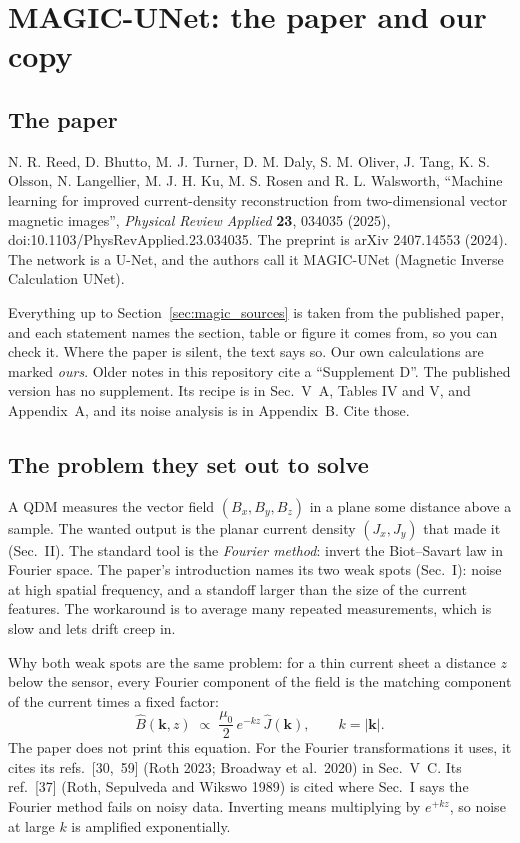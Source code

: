 \chapter{MAGIC-UNet: the paper and our copy}\label{ch:magic}

\section{The paper}

N. R. Reed, D. Bhutto, M. J. Turner, D. M. Daly, S. M. Oliver, J. Tang, K. S. Olsson, N. Langellier, M. J. H. Ku,
M. S. Rosen and R. L. Walsworth, ``Machine learning for improved current-density reconstruction from two-dimensional
vector magnetic images'', \emph{Physical Review Applied} \textbf{23}, 034035 (2025), doi:10.1103/PhysRevApplied.23.034035.
The preprint is arXiv 2407.14553 (2024). The network is a U-Net, and the authors call it MAGIC-UNet (Magnetic Inverse
Calculation UNet).

\begin{keyidea}
Everything up to Section~\ref{sec:magic_sources} is taken from the published paper, and each statement names the section,
table or figure it comes from, so you can check it. Where the paper is silent, the text says so. Our own calculations are
marked \emph{ours}. Older notes in this repository cite a ``Supplement D''. The published version has no supplement. Its
recipe is in Sec.~V~A, Tables IV and V, and Appendix~A, and its noise analysis is in Appendix~B. Cite those.
\end{keyidea}

\section{The problem they set out to solve}

A QDM measures the vector field $(B_x, B_y, B_z)$ in a plane some distance above a sample. The wanted output is the
planar current density $(J_x, J_y)$ that made it (Sec.~II). The standard tool is the \emph{Fourier method}: invert the
Biot--Savart law in Fourier space. The paper's introduction names its two weak spots (Sec.~I): noise at high spatial
frequency, and a standoff larger than the size of the current features. The workaround is to average many repeated
measurements, which is slow and lets drift creep in.

Why both weak spots are the same problem: for a thin current sheet a distance $z$ below the sensor, every Fourier
component of the field is the matching component of the current times a fixed factor:
\begin{equation}
\hat B(\bm k, z) \;\propto\; \frac{\mu_0}{2}\, e^{-kz}\, \hat J(\bm k), \qquad k = |\bm k|.
\label{eq:magic_decay}
\end{equation}
The paper does not print this equation. For the Fourier transformations it uses, it cites its refs.~[30,~59] (Roth
2023; Broadway et al.\ 2020) in Sec.~V~C. Its ref.~[37] (Roth, Sepulveda and Wikswo 1989) is cited where Sec.~I says the
Fourier method fails on noisy data. Inverting means multiplying by $e^{+kz}$, so noise at large $k$ is amplified
exponentially.

